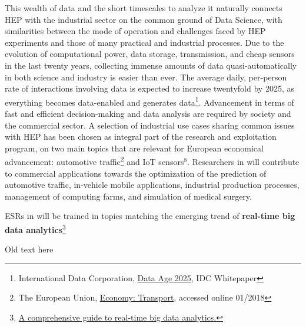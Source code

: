 This wealth of data and the short timescales to analyze it naturally connects HEP with the industrial sector on the common ground of Data Science, with similarities between the mode of operation and challenges faced by HEP experiments and those of many practical and industrial processes. 
Due to the evolution of computational power, data storage, transmission, and cheap sensors in the last twenty years, collecting immense amounts of data quasi-automatically in both science and industry is easier than ever. 
The average daily, per-person rate of interactions involving data is expected to increase twentyfold by 2025, as everything becomes data-enabled and generates data\footnote{International Data Corporation, \href{https://www.seagate.com/files/www-content/our-story/trends/files/Seagate-WP-DataAge2025-March-2017.pdf}{Data Age 2025}, IDC Whitepaper}.
Advancement in terms of fast and efficient decision-making and data analysis are required by society and the commercial sector. A selection of industrial use cases sharing common issues with HEP has been chosen as integral part of the \acronym research and exploitation program, on two main topics that are
relevant for European economical advancement: automotive traffic\footnote{The European Union, \href{https://europa.eu/european-union/about-eu/figures/economy_en}{Economy: Transport}, accessed online 01/2018} and IoT sensors$^8$. 
Researchers in \acronym will contribute to commercial applications towards the optimization of the prediction of automotive traffic, in-vehicle mobile applications, industrial production processes, management of computing farms, and simulation of medical surgery. 




ESRs in \acronym will be trained in topics matching the emerging trend of \textbf{real-time big data analytics}\footnote{\href{https://www.scnsoft.com/blog/real-time-big-data-analytics-comprehensive-guide}{A comprehensive guide to real-time big data analytics.}} 

\Large{Old text here}
\normalsize


